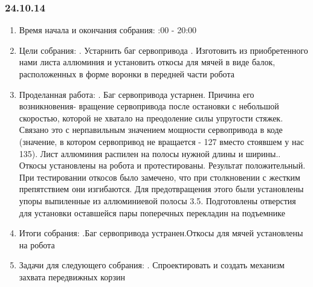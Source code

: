 \documentclass[11pt]{article}
\begin{document}
       \subsubsection{24.10.14}
      \begin{enumerate}
       \item Время начала и окончания собрания:
     :00 - 20:00
     \item Цели собрания:
     . Устарнить баг сервопривода
     . Изготовить из приобретенного нами листа аллюминия и установить откосы для мячей в виде балок, расположенных в форме воронки в передней части робота
     \item Проделанная работа:
     . Баг сервопривода устарнен. Причина его возникновения- вращение сервопривода после остановки с небольшой скоростью, которой не хватало на преодоление силы упругости стяжек. Связано это с нерпавильным значением мощности сервопривода в коде (значение, в котором сервопривод не вращается - 127 вместо стоявшем у нас 135). Лист аллюминия распилен на полосы нужной длины и ширины.. Откосы установлены на робота и протестированы. Результат положительный. При тестировании откосов было замечено, что при столкновении с жестким препятствием они изгибаются. Для предотвращения этого были установлены упоры выпиленные из аллюминиевой полосы
     3.5. Подготовлены отверстия для установки оставшейся пары поперечных перекладин на подъемнике
     \item Итоги собрания:
     .Баг сервопривода устранен.Откосы для мячей установлены на робота
     \item Задачи для следующего собрания:
     . Спроектировать и создать механизм захвата передвижных корзин
 \end{enumerate}
\end{document}

